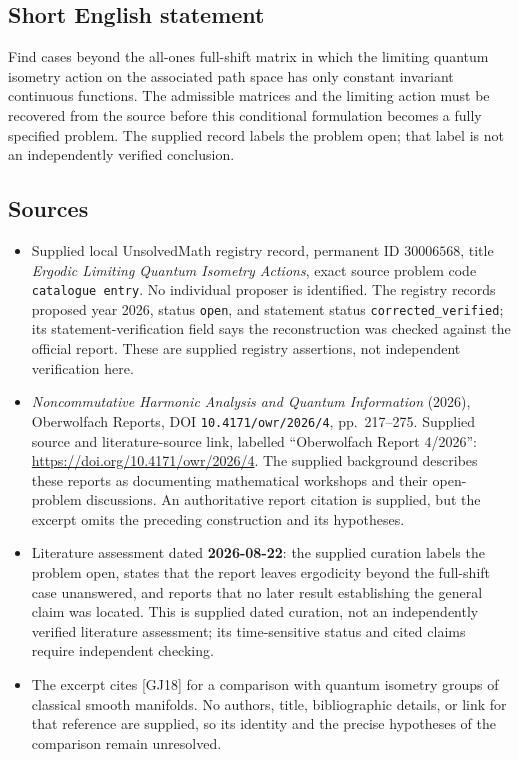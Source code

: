 \documentclass[11pt]{article}
\begin{document}
\subsection{Short English statement}
Find cases beyond the all-ones full-shift matrix in which the limiting quantum isometry action on the associated path space has only constant invariant continuous functions. The admissible matrices and the limiting action must be recovered from the source before this conditional formulation becomes a fully specified problem. The supplied record labels the problem open; that label is not an independently verified conclusion.
\subsection{Sources}
\begin{itemize}
\item Supplied local UnsolvedMath registry record, permanent ID \(30006568\), title \emph{Ergodic Limiting Quantum Isometry Actions}, exact source problem code \texttt{catalogue entry}. No individual proposer is identified. The registry records proposed year 2026, status \texttt{open}, and statement status \texttt{corrected\_verified}; its statement-verification field says the reconstruction was checked against the official report. These are supplied registry assertions, not independent verification here.
\item \emph{Noncommutative Harmonic Analysis and Quantum Information} (2026), Oberwolfach Reports, DOI \texttt{10.4171/owr/2026/4}, pp.\ 217--275. Supplied source and literature-source link, labelled ``Oberwolfach Report 4/2026'': \url{https://doi.org/10.4171/owr/2026/4}. The supplied background describes these reports as documenting mathematical workshops and their open-problem discussions. An authoritative report citation is supplied, but the excerpt omits the preceding construction and its hypotheses.
\item Literature assessment dated \textbf{2026-08-22}: the supplied curation labels the problem open, states that the report leaves ergodicity beyond the full-shift case unanswered, and reports that no later result establishing the general claim was located. This is supplied dated curation, not an independently verified literature assessment; its time-sensitive status and cited claims require independent checking.
\item The excerpt cites \textnormal{[GJ18]} for a comparison with quantum isometry groups of classical smooth manifolds. No authors, title, bibliographic details, or link for that reference are supplied, so its identity and the precise hypotheses of the comparison remain unresolved.
\end{itemize}
\end{document}
